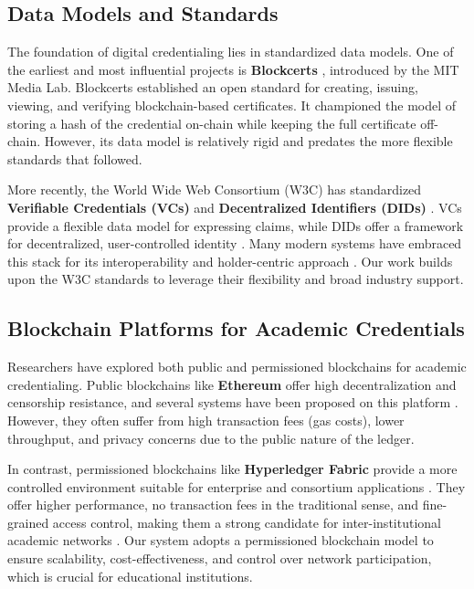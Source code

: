 \documentclass[lettersize,journal]{IEEEtran}
\begin{document}
\subsection{Data Models and Standards}
The foundation of digital credentialing lies in standardized data models. One of the earliest and most influential projects is \textbf{Blockcerts} \cite{Blockcerts}, introduced by the MIT Media Lab. Blockcerts established an open standard for creating, issuing, viewing, and verifying blockchain-based certificates. It championed the model of storing a hash of the credential on-chain while keeping the full certificate off-chain. However, its data model is relatively rigid and predates the more flexible standards that followed.

More recently, the World Wide Web Consortium (W3C) has standardized \textbf{Verifiable Credentials (VCs)} and \textbf{Decentralized Identifiers (DIDs)} \cite{DIDSurvey2024, SSI2023}. VCs provide a flexible data model for expressing claims, while DIDs offer a framework for decentralized, user-controlled identity \cite{SoKVC2023}. Many modern systems have embraced this stack for its interoperability and holder-centric approach \cite{NovelAuthScheme2024, BlockchainDVC2023}. Our work builds upon the W3C standards to leverage their flexibility and broad industry support.

\subsection{Blockchain Platforms for Academic Credentials}
Researchers have explored both public and permissioned blockchains for academic credentialing. Public blockchains like \textbf{Ethereum} offer high decentralization and censorship resistance, and several systems have been proposed on this platform \cite{EthDIDVC}. However, they often suffer from high transaction fees (gas costs), lower throughput, and privacy concerns due to the public nature of the ledger.

In contrast, permissioned blockchains like \textbf{Hyperledger Fabric} provide a more controlled environment suitable for enterprise and consortium applications \cite{FabricEdu}. They offer higher performance, no transaction fees in the traditional sense, and fine-grained access control, making them a strong candidate for inter-institutional academic networks \cite{CredenceLedger2018}. Our system adopts a permissioned blockchain model to ensure scalability, cost-effectiveness, and control over network participation, which is crucial for educational institutions.
\end{document}
